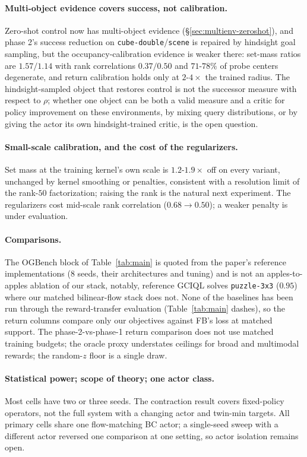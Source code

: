 \documentclass{article}
\begin{document}
\paragraph{Multi-object evidence covers success, not calibration.}
Zero-shot control now has multi-object evidence (\S\ref{sec:multienv-zeroshot}), and phase 2's success reduction on \texttt{cube-double}/\texttt{scene} is repaired by hindsight goal sampling, but the occupancy-calibration evidence is weaker there: set-mass ratios are $1.57/1.14$ with rank correlations $0.37/0.50$ and $71$-$78\%$ of probe centers degenerate, and return calibration holds only at $2$-$4\times$ the trained radius.
The hindsight-sampled object that restores control is not the successor measure with respect to $\rho$; whether one object can be both a valid measure and a critic for policy improvement on these environments, by mixing query distributions, or by giving the actor its own hindsight-trained critic, is the open question.

\paragraph{Small-scale calibration, and the cost of the regularizers.}
Set mass at the training kernel's own scale is $1.2$-$1.9\times$ off on every variant, unchanged by kernel smoothing or penalties, consistent with a resolution limit of the rank-$50$ factorization; raising the rank is the natural next experiment.
The regularizers cost mid-scale rank correlation ($0.68\to0.50$); a weaker penalty is under evaluation.

\paragraph{Comparisons.}
The OGBench block of Table~\ref{tab:main} is quoted from the paper's reference implementations ($8$ seeds, their architectures and tuning) and is not an apples-to-apples ablation of our stack, notably, reference GCIQL solves \texttt{puzzle-3x3} ($0.95$) where our matched bilinear-flow stack does not.
None of the baselines has been run through the reward-transfer evaluation (Table~\ref{tab:main} dashes), so the return columns compare only our objectives against FB's loss at matched support.
The phase-2-vs-phase-1 return comparison does not use matched training budgets; the oracle proxy understates ceilings for broad and multimodal rewards; the random-$z$ floor is a single draw.

\paragraph{Statistical power; scope of theory; one actor class.}
Most cells have two or three seeds.
The contraction result covers fixed-policy operators, not the full system with a changing actor and twin-min targets.
All primary cells share one flow-matching BC actor; a single-seed sweep with a different actor reversed one comparison at one setting, so actor isolation remains open.
\end{document}
